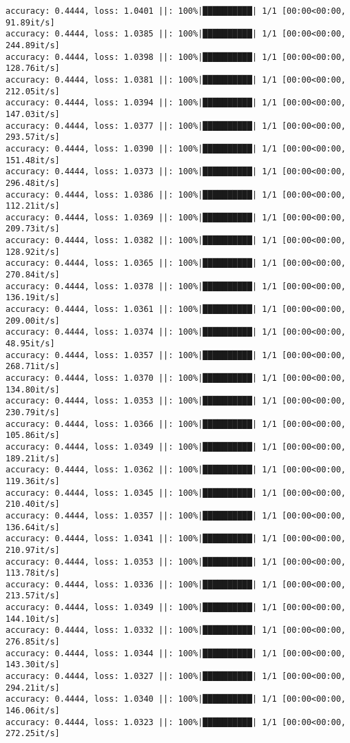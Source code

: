 \documentclass[
]{article}
\begin{document}
\begin{verbatim}
accuracy: 0.4444, loss: 1.0401 ||: 100%|██████████| 1/1 [00:00<00:00, 91.89it/s]
accuracy: 0.4444, loss: 1.0385 ||: 100%|██████████| 1/1 [00:00<00:00, 244.89it/s]
accuracy: 0.4444, loss: 1.0398 ||: 100%|██████████| 1/1 [00:00<00:00, 128.76it/s]
accuracy: 0.4444, loss: 1.0381 ||: 100%|██████████| 1/1 [00:00<00:00, 212.05it/s]
accuracy: 0.4444, loss: 1.0394 ||: 100%|██████████| 1/1 [00:00<00:00, 147.03it/s]
accuracy: 0.4444, loss: 1.0377 ||: 100%|██████████| 1/1 [00:00<00:00, 293.57it/s]
accuracy: 0.4444, loss: 1.0390 ||: 100%|██████████| 1/1 [00:00<00:00, 151.48it/s]
accuracy: 0.4444, loss: 1.0373 ||: 100%|██████████| 1/1 [00:00<00:00, 296.48it/s]
accuracy: 0.4444, loss: 1.0386 ||: 100%|██████████| 1/1 [00:00<00:00, 112.21it/s]
accuracy: 0.4444, loss: 1.0369 ||: 100%|██████████| 1/1 [00:00<00:00, 209.73it/s]
accuracy: 0.4444, loss: 1.0382 ||: 100%|██████████| 1/1 [00:00<00:00, 128.92it/s]
accuracy: 0.4444, loss: 1.0365 ||: 100%|██████████| 1/1 [00:00<00:00, 270.84it/s]
accuracy: 0.4444, loss: 1.0378 ||: 100%|██████████| 1/1 [00:00<00:00, 136.19it/s]
accuracy: 0.4444, loss: 1.0361 ||: 100%|██████████| 1/1 [00:00<00:00, 209.00it/s]
accuracy: 0.4444, loss: 1.0374 ||: 100%|██████████| 1/1 [00:00<00:00, 48.95it/s]
accuracy: 0.4444, loss: 1.0357 ||: 100%|██████████| 1/1 [00:00<00:00, 268.71it/s]
accuracy: 0.4444, loss: 1.0370 ||: 100%|██████████| 1/1 [00:00<00:00, 134.80it/s]
accuracy: 0.4444, loss: 1.0353 ||: 100%|██████████| 1/1 [00:00<00:00, 230.79it/s]
accuracy: 0.4444, loss: 1.0366 ||: 100%|██████████| 1/1 [00:00<00:00, 105.86it/s]
accuracy: 0.4444, loss: 1.0349 ||: 100%|██████████| 1/1 [00:00<00:00, 189.21it/s]
accuracy: 0.4444, loss: 1.0362 ||: 100%|██████████| 1/1 [00:00<00:00, 119.36it/s]
accuracy: 0.4444, loss: 1.0345 ||: 100%|██████████| 1/1 [00:00<00:00, 210.40it/s]
accuracy: 0.4444, loss: 1.0357 ||: 100%|██████████| 1/1 [00:00<00:00, 136.64it/s]
accuracy: 0.4444, loss: 1.0341 ||: 100%|██████████| 1/1 [00:00<00:00, 210.97it/s]
accuracy: 0.4444, loss: 1.0353 ||: 100%|██████████| 1/1 [00:00<00:00, 113.78it/s]
accuracy: 0.4444, loss: 1.0336 ||: 100%|██████████| 1/1 [00:00<00:00, 213.57it/s]
accuracy: 0.4444, loss: 1.0349 ||: 100%|██████████| 1/1 [00:00<00:00, 144.10it/s]
accuracy: 0.4444, loss: 1.0332 ||: 100%|██████████| 1/1 [00:00<00:00, 276.85it/s]
accuracy: 0.4444, loss: 1.0344 ||: 100%|██████████| 1/1 [00:00<00:00, 143.30it/s]
accuracy: 0.4444, loss: 1.0327 ||: 100%|██████████| 1/1 [00:00<00:00, 294.21it/s]
accuracy: 0.4444, loss: 1.0340 ||: 100%|██████████| 1/1 [00:00<00:00, 146.06it/s]
accuracy: 0.4444, loss: 1.0323 ||: 100%|██████████| 1/1 [00:00<00:00, 272.25it/s]

\end{verbatim}
\end{document}

